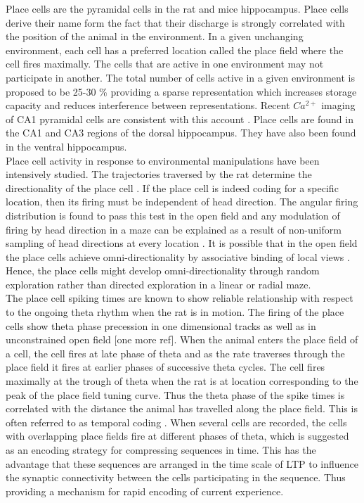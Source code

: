 Place cells are the  pyramidal cells in the rat and mice hippocampus. Place cells derive their name form the fact that their discharge is strongly correlated with the position of the animal in the environment. In a given unchanging environment, each cell has a preferred location called the place field where the cell fires maximally.  The cells that are active in one environment may not participate in another. The total number of cells active in a given environment is proposed to be 25-30 \% providing a sparse representation which increases storage capacity and reduces interference between representations\cite{Marr2007, Wilson1993}. Recent $Ca^{2+}$ imaging of CA1 pyramidal cells are consistent with this account \cite{Ziv2013}.
Place cells are found in the CA1 and CA3 regions of the dorsal hippocampus. They have also been found in the ventral hippocampus.\\
Place cell activity in response to environmental manipulations have been intensively studied. The trajectories traversed by the rat determine the directionality of the place cell \cite{Save1998}. If the place cell is indeed coding for a specific location, then its firing must be independent of  head direction. The angular firing distribution is found to pass this test in the open field and any modulation of firing by head direction in a maze can be explained as a result of non-uniform sampling of head directions at every location \cite{Muller1994}. It is possible that in the open field the place cells achieve omni-directionality by associative binding of local views \cite{Sharp1991}. Hence, the place cells might develop omni-directionality through random exploration rather than directed exploration in a linear or radial maze.\\
The place cell spiking times are known to show reliable relationship with respect to the ongoing theta rhythm when the rat is in motion. The firing of the place cells show theta phase precession in one dimensional tracks \cite{O'Keefe1993} as well as in unconstrained open field \cite{Skaggs1996c} [one more ref]. When the animal enters the place field of a cell, the cell fires at late phase of theta and as the rate traverses through the place field it fires at earlier phases of successive theta cycles. The cell fires maximally at the trough of theta when the rat is at location corresponding to the peak of the place field tuning curve. Thus the theta phase of the spike times is correlated with the distance the animal has travelled along the place field. This is often referred to as temporal coding \cite{Huxter2003}. When several cells are recorded, the cells with overlapping place fields fire at different phases of theta, which is suggested as an encoding strategy for compressing sequences in time. This has the advantage that these sequences are arranged in the time scale of LTP to influence the synaptic connectivity between the cells participating in the sequence. Thus providing a mechanism for rapid encoding of current experience. \\
